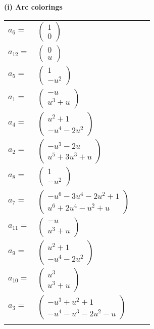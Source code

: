\documentclass[1p]{elsarticle_modified}
\theoremstyle{definition}
\begin{document}
\flushleft \textbf{(i) Arc colorings}\\
\begin{tabular}{m{7pt} m{180pt} m{7pt} m{180pt} }
\flushright $a_{6}=$&$\begin{pmatrix}1\\0\end{pmatrix}$ \\
\flushright $a_{12}=$&$\begin{pmatrix}0\\u\end{pmatrix}$ \\
\flushright $a_{5}=$&$\begin{pmatrix}1\\- u^2\end{pmatrix}$ \\
\flushright $a_{1}=$&$\begin{pmatrix}- u\\u^3+u\end{pmatrix}$ \\
\flushright $a_{4}=$&$\begin{pmatrix}u^2+1\\- u^4-2 u^2\end{pmatrix}$ \\
\flushright $a_{2}=$&$\begin{pmatrix}- u^3-2 u\\u^5+3 u^3+u\end{pmatrix}$ \\
\flushright $a_{8}=$&$\begin{pmatrix}1\\- u^2\end{pmatrix}$ \\
\flushright $a_{7}=$&$\begin{pmatrix}- u^6-3 u^4-2 u^2+1\\u^6+2 u^4- u^2+u\end{pmatrix}$ \\
\flushright $a_{11}=$&$\begin{pmatrix}- u\\u^3+u\end{pmatrix}$ \\
\flushright $a_{9}=$&$\begin{pmatrix}u^2+1\\- u^4-2 u^2\end{pmatrix}$ \\
\flushright $a_{10}=$&$\begin{pmatrix}u^3\\u^3+u\end{pmatrix}$ \\
\flushright $a_{3}=$&$\begin{pmatrix}- u^3+u^2+1\\- u^4- u^3-2 u^2- u\end{pmatrix}$\\&\end{tabular}
\end{document}
